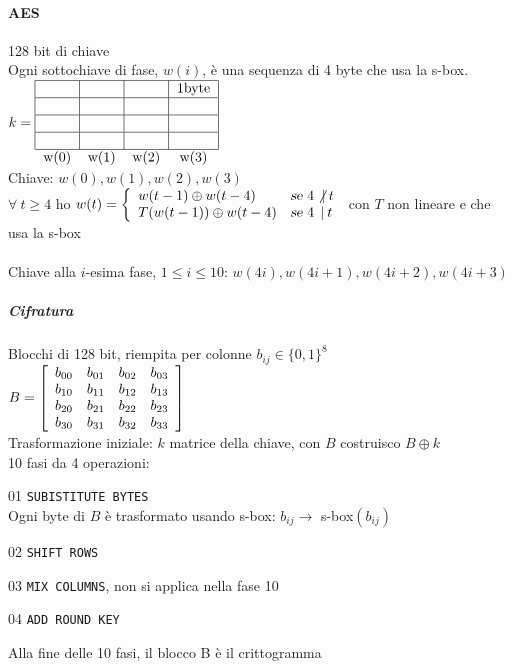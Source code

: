 \documentclass[10pt]{book}
\begin{document}
\paragraph{AES} 128 bit di chiave\\
Ogni sottochiave di fase, $w(i)$, è una sequenza di 4 byte che usa la s-box.\\
$k = \begin{tabular}{|c|c|c|c|}
\hline
 & & & 1byte \\
\hline
 & & & \\
\hline
 & & & \\
\hline
 & & & \\
\hline
\multicolumn{1}{c}{w(0)} & \multicolumn{1}{c}{w(1)} & \multicolumn{1}{c}{w(2)} & \multicolumn{1}{c}{w(3)}\\
\end{tabular}$\\
Chiave: $w(0), w(1), w(2), w(3)$\\
$\forall\:t\geq 4$ ho $w(t) = \left\{\begin{array}{l l}
w(t-1)\oplus w(t-4) &\textsl{se }4\not|\:t\\
T(w(t-1))\oplus w(t-4) &\textsl{se }4\:\:|\:t
\end{array}\right.$ con $T$ non lineare e che usa la s-box\\\\
Chiave alla $i$-esima fase, $1\leq i \leq 10$: $w(4i), w(4i + 1), w(4i + 2), w(4i + 3)$
\subparagraph{Cifratura} Blocchi di 128 bit, riempita per colonne $b_{ij} \in \{0, 1\}^8$\\
$B = \left[\begin{array}{c c c c}
b_{00} & b_{01} & b_{02} & b_{03} \\
b_{10} & b_{11} & b_{12} & b_{13} \\
b_{20} & b_{21} & b_{22} & b_{23} \\
b_{30} & b_{31} & b_{32} & b_{33} \\
\end{array}\right]$\\
Trasformazione iniziale: $k$ matrice della chiave, con $B$ costruisco $B\oplus k$\\
10 fasi da 4 operazioni:
\begin{list}{}{}
	\item[01] \texttt{SUBISTITUTE BYTES}\\
	Ogni byte di $B$ è trasformato usando s-box: $b_{ij} \rightarrow$ s-box$(b_{ij})$
	\item[02] \texttt{SHIFT ROWS}
	\item[03] \texttt{MIX COLUMNS}, non si applica nella fase 10
	\item[04] \texttt{ADD ROUND KEY}
	\item Alla fine delle 10 fasi, il blocco B è il crittogramma
\end{list}
\end{document}
